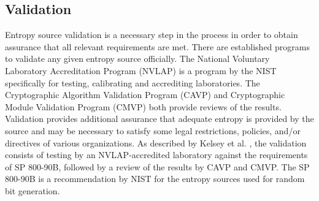 \subsection{Validation}
Entropy source validation is a necessary step in the process in order to obtain assurance that all relevant requirements are met.
There are established programs to validate any given entropy source officially. 
The National Voluntary Laboratory Accreditation Program (NVLAP) is a program by the NIST specifically for testing, calibrating and accrediting laboratories.
The Cryptographic Algorithm Validation Program (CAVP) and Cryptographic Module Validation Program (CMVP) both provide reviews of the results\cite{entropy:cmvp}.
\newline
Validation provides additional assurance that adequate entropy is provided by the
source and may be necessary to satisfy some legal restrictions, policies, and/or directives of various
organizations.
\newline
As described by Kelsey et al. \cite{randomness:sources1}, the validation consists of testing by an NVLAP-accredited
laboratory against the requirements of SP 800-90B, followed by a review of the results by CAVP and CMVP.
The SP 800-90B is a recommendation by NIST for the entropy sources used for random bit generation\cite{randomness:validation}.

